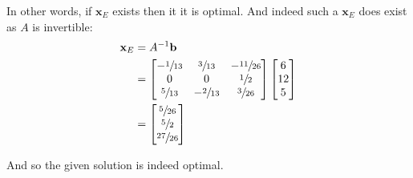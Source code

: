 \documentclass{article}
\renewcommand\vec{\mathbf}
\begin{document}
In other words, if $\vec x_E$ exists then it it is optimal. And indeed such a $\vec x_E$ does exist as $A$ is invertible:
\begin{align*}
    \vec x_E&=A^{-1}\vec b\\
    &=\begin{bmatrix}
        -\sfrac{1}{13}&\sfrac{3}{13}&-\sfrac{11}{26}\\0&0&\sfrac{1}{2}\\\sfrac{5}{13}&-\sfrac{2}{13}&\sfrac{3}{26}
    \end{bmatrix}\begin{bmatrix}
        6\\12\\5
    \end{bmatrix}\\
    &=\begin{bmatrix}
        \sfrac{5}{26}\\\sfrac{5}{2}\\\sfrac{27}{26}
    \end{bmatrix}
\end{align*}

And so the given solution is indeed optimal.
\end{document}
